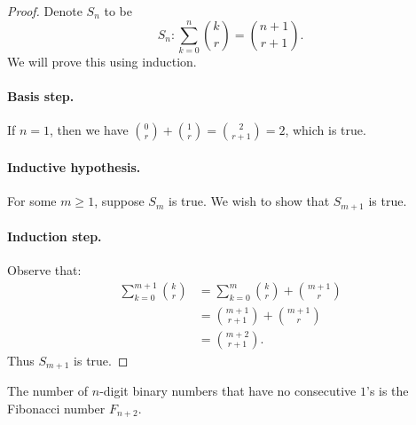 \documentclass{exam}
\begin{document}
\begin{proof}
    Denote $S_n$ to be $$S_n: \sum_{k=0}^n\binom k r=\binom{n+1}{r+1}.$$ We will prove this using induction.

    \paragraph{Basis step.} If $n = 1$, then we have $\binom0r + \binom1r = \binom2{r + 1} = 2$, which is true.

    \paragraph{Inductive hypothesis.} For some $m\ge 1$, suppose $S_m$ is true. We wish to show that $S_{m+1}$ is true.

    \paragraph{Induction step.} Observe that:
    \begin{align*}
        \sum_{k=0}^{m+1}\binom k r &= \sum_{k=0}^m\binom k r + \binom{m+1}r\\
        &=\binom{m+1}{r+1} + \binom{m+1}r\\
        &=\binom{m+2}{r+1}.
    \end{align*}
    Thus $S_{m+1}$ is true.
\end{proof}

\begin{proposition}{10.32}
    The number of $n$-digit binary numbers that have no consecutive $1$'s is the Fibonacci number $F_{n+2}$.
\end{proposition}
\end{document}
